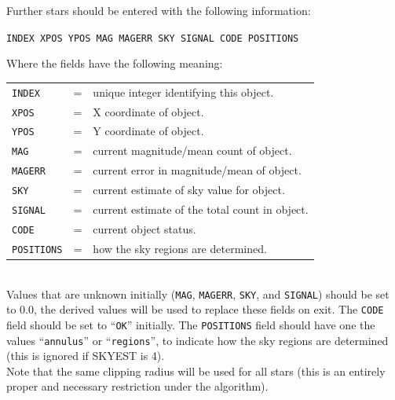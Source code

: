 \documentclass[twoside,11pt]{article}
\renewcommand{\_}{\texttt{\symbol{95}}}
\newcommand{\ft}[1]{``\texttt{#1}''}
\begin{document}
{{{      Further stars should be entered with the following information:
        \begin{description}
           \item  \texttt{INDEX XPOS YPOS MAG MAGERR SKY SIGNAL CODE POSITIONS }
        \end{description}
       Where the fields have the following meaning:\\
        \begin{tabular}{lll}
           \texttt{INDEX} & = & unique integer identifying this object.\\
           \texttt{XPOS} & = & X coordinate of object.\\
           \texttt{YPOS} & = & Y coordinate of object.\\
           \texttt{MAG} & = & current magnitude/mean count of object.\\
           \texttt{MAGERR} & = & current error in magnitude/mean of object.\\
           \texttt{SKY} & = & current estimate of sky value for object.\\
           \texttt{SIGNAL} & = & current estimate of the total count in object.\\
           \texttt{CODE} & = & current object status.\\
           \texttt{POSITIONS} & = & how the sky regions are determined.\\
         \end{tabular}\\
      Values that are unknown initially (\texttt{MAG}, \texttt{MAGERR}, \texttt{SKY}, and \texttt{SIGNAL})
      should be set to 0.0, the derived values will be used to replace
      these fields on exit. The \texttt{CODE} field should be set to \ft{OK}
      initially. The \texttt{POSITIONS} field should have one the values
      \ft{annulus} or \ft{regions}, to indicate how the sky regions are
      determined (this is ignored if SKYEST is 4). \\

      Note that the same clipping radius will be used for all stars (this
      is an entirely proper and necessary restriction under the algorithm).\\

}}}
\end{document}
